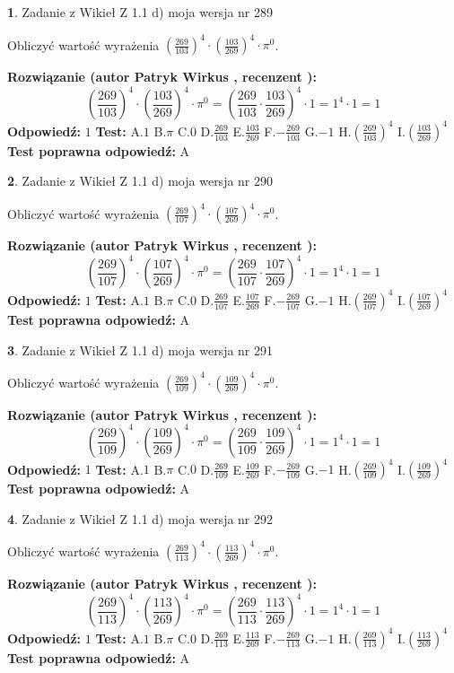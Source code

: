 \documentclass[12pt, a4paper]{article}
\theoremstyle{definition} %
\newtheorem{zad}{}
\newcommand{\zadStart}[1]{\begin{zad}#1\newline}
\newcommand{\zadStop}{\end{zad}}
\newcommand{\rozwStart}[2]{\noindent \textbf{Rozwiązanie (autor #1 , recenzent #2): }\newline}
\newcommand{\rozwStop}{\newline}
\newcommand{\odpStart}{\noindent \textbf{Odpowiedź:}\newline}
\newcommand{\odpStop}{\newline}
\newcommand{\testStart}{\noindent \textbf{Test:}\newline}
\newcommand{\testStop}{\newline}
\newcommand{\kluczStart}{\noindent \textbf{Test poprawna odpowiedź:}\newline}
\newcommand{\kluczStop}{\newline}
\begin{document}
\zadStart{Zadanie z Wikieł Z 1.1 d) moja wersja nr 289}

Obliczyć wartość wyrażenia $(\frac{269}{103})^{4} \cdot (\frac{103}{269})^{4} \cdot \pi^{0}$.
\zadStop
\rozwStart{Patryk Wirkus}{}
$$(\frac{269}{103})^{4} \cdot (\frac{103}{269})^{4} \cdot \pi^{0} = (\frac{269}{103} \cdot \frac{103}{269})^{4} \cdot 1 = 1^{4} \cdot 1 = 1$$
\rozwStop
\odpStart
$1$
\odpStop
\testStart
A.$1$ B.$\pi$ C.$0$ D.$\frac{269}{103}$ E.$\frac{103}{269}$
F.$-\frac{269}{103}$ G.$-1$
H.$(\frac{269}{103})^{4}$
I.$(\frac{103}{269})^{4}$
\testStop
\kluczStart
A
\kluczStop



\zadStart{Zadanie z Wikieł Z 1.1 d) moja wersja nr 290}

Obliczyć wartość wyrażenia $(\frac{269}{107})^{4} \cdot (\frac{107}{269})^{4} \cdot \pi^{0}$.
\zadStop
\rozwStart{Patryk Wirkus}{}
$$(\frac{269}{107})^{4} \cdot (\frac{107}{269})^{4} \cdot \pi^{0} = (\frac{269}{107} \cdot \frac{107}{269})^{4} \cdot 1 = 1^{4} \cdot 1 = 1$$
\rozwStop
\odpStart
$1$
\odpStop
\testStart
A.$1$ B.$\pi$ C.$0$ D.$\frac{269}{107}$ E.$\frac{107}{269}$
F.$-\frac{269}{107}$ G.$-1$
H.$(\frac{269}{107})^{4}$
I.$(\frac{107}{269})^{4}$
\testStop
\kluczStart
A
\kluczStop



\zadStart{Zadanie z Wikieł Z 1.1 d) moja wersja nr 291}

Obliczyć wartość wyrażenia $(\frac{269}{109})^{4} \cdot (\frac{109}{269})^{4} \cdot \pi^{0}$.
\zadStop
\rozwStart{Patryk Wirkus}{}
$$(\frac{269}{109})^{4} \cdot (\frac{109}{269})^{4} \cdot \pi^{0} = (\frac{269}{109} \cdot \frac{109}{269})^{4} \cdot 1 = 1^{4} \cdot 1 = 1$$
\rozwStop
\odpStart
$1$
\odpStop
\testStart
A.$1$ B.$\pi$ C.$0$ D.$\frac{269}{109}$ E.$\frac{109}{269}$
F.$-\frac{269}{109}$ G.$-1$
H.$(\frac{269}{109})^{4}$
I.$(\frac{109}{269})^{4}$
\testStop
\kluczStart
A
\kluczStop



\zadStart{Zadanie z Wikieł Z 1.1 d) moja wersja nr 292}

Obliczyć wartość wyrażenia $(\frac{269}{113})^{4} \cdot (\frac{113}{269})^{4} \cdot \pi^{0}$.
\zadStop
\rozwStart{Patryk Wirkus}{}
$$(\frac{269}{113})^{4} \cdot (\frac{113}{269})^{4} \cdot \pi^{0} = (\frac{269}{113} \cdot \frac{113}{269})^{4} \cdot 1 = 1^{4} \cdot 1 = 1$$
\rozwStop
\odpStart
$1$
\odpStop
\testStart
A.$1$ B.$\pi$ C.$0$ D.$\frac{269}{113}$ E.$\frac{113}{269}$
F.$-\frac{269}{113}$ G.$-1$
H.$(\frac{269}{113})^{4}$
I.$(\frac{113}{269})^{4}$
\testStop
\kluczStart
A
\kluczStop
\end{document}
